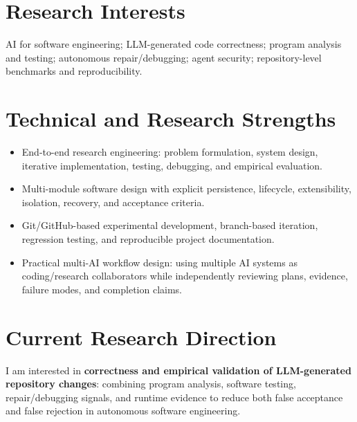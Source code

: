 \documentclass[10pt,a4paper]{article}
\begin{document}
\section{Research Interests}
AI for software engineering; LLM-generated code correctness; program analysis and testing; autonomous repair/debugging; agent security; repository-level benchmarks and reproducibility.

\section{Technical and Research Strengths}
\begin{itemize}
  \item End-to-end research engineering: problem formulation, system design, iterative implementation, testing, debugging, and empirical evaluation.
  \item Multi-module software design with explicit persistence, lifecycle, extensibility, isolation, recovery, and acceptance criteria.
  \item Git/GitHub-based experimental development, branch-based iteration, regression testing, and reproducible project documentation.
  \item Practical multi-AI workflow design: using multiple AI systems as coding/research collaborators while independently reviewing plans, evidence, failure modes, and completion claims.
\end{itemize}

\section{Current Research Direction}
I am interested in \textbf{correctness and empirical validation of LLM-generated repository changes}: combining program analysis, software testing, repair/debugging signals, and runtime evidence to reduce both false acceptance and false rejection in autonomous software engineering.
\end{document}
